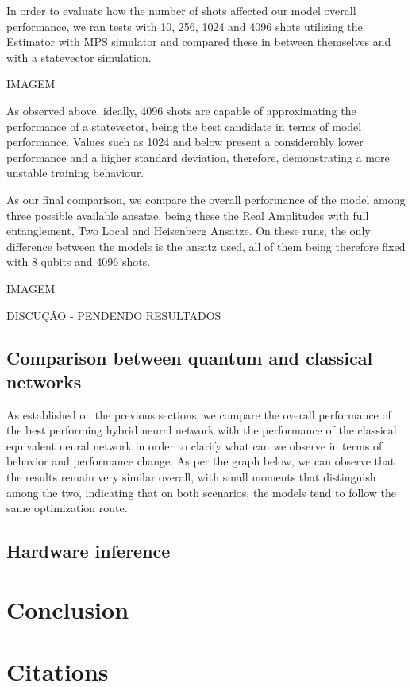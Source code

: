 In order to evaluate how the number of shots affected our model overall performance, we ran tests with 10, 256, 1024 and 4096 shots utilizing the Estimator with MPS simulator and compared these in between themselves and with a statevector simulation. 

IMAGEM 

As observed above, ideally, 4096 shots are capable of approximating the performance of a statevector, being the best candidate in terms of model performance. Values such as 1024 and below present a considerably lower performance and a higher standard deviation, therefore, demonstrating a more unstable training behaviour.


As our final comparison, we compare the overall performance of the model among three possible available ansatze, being these the Real Amplitudes with full entanglement, Two Local and Heisenberg Ansatze. On these runs, the only difference between the models is the ansatz used, all of them being therefore fixed with 8 qubits and 4096 shots.

IMAGEM

DISCUÇÃO - PENDENDO RESULTADOS

\subsection{Comparison between quantum and classical networks}
As established on the previous sections, we compare the overall performance of the best performing hybrid neural network with the performance of the classical equivalent neural network in order to clarify what can we observe in terms of behavior and performance change. As per the graph below, we can observe that the results remain very similar overall, with small moments that distinguish among the two, indicating that on both scenarios, the models tend to follow the same optimization route.

\subsection{Hardware inference}

\section{Conclusion}

\section{Citations}






